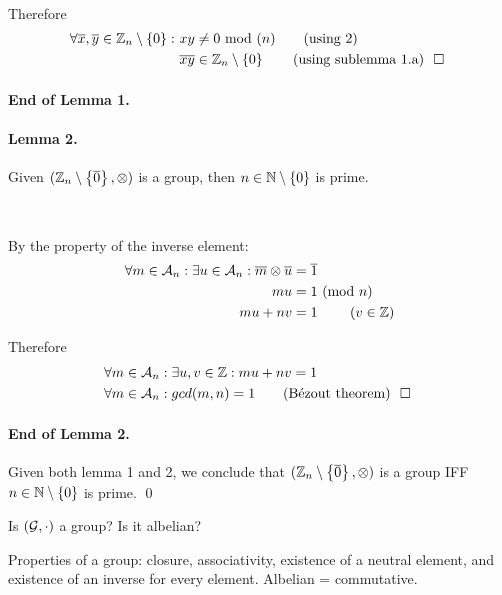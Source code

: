 \

Therefore
\begin{align*}
	\forall \overline x, \overline y \in \mathbb Z_n \minusset{0}: \ &xy \neq 0\ \text{mod ($n$)} \tag{using 2} \\
	& \overline {xy} \in \mathbb Z_n \minusset{0} \tag*{(using sublemma 1.a) \qedl} \\
\end{align*}

\paragraph {End of Lemma 1.} \qedl

\paragraph{Lemma 2.} Given $(\mathbb Z_n \setminus\left\{\overline 0\right\}, \otimes)$ is a group, then $n \in \mathbb N \setminus\left\{0\right\}$ is prime.

\

By the property of the inverse element:
\begin{align*}
	\forall m \in \mathcal A_n: \exists u \in \mathcal A_n: \overline m \otimes \overline u &= \overline 1 \\
	mu &= 1\ \text{(mod $n$)} \\
	mu + nv &= 1\ \tag{$v \in \mathbb Z$}
\end{align*}

Therefore
\begin{align*}
	\forall m \in \set A_n&: \exists u, v \in \mathbb Z: mu + nv = 1 \\
	\forall m \in \set A_n&: gcd(m, n) = 1 \tag* {(Bézout theorem) \qedl}
\end{align*}

\paragraph{End of Lemma 2.} \qedl

\conclusion Given both lemma 1 and 2, we conclude that $(\mathbb Z_n \setminus\left\{\overline 0\right\}, \otimes)$ is a group IFF $n \in \mathbb N \setminus\left\{0\right\}$ is prime. \qed

 Is $(\mathcal G, \cdot)$ a group? Is it albelian?

\insight
Properties of a group: closure, associativity, existence of a neutral element, and existence of an inverse for every element. Albelian = commutative.

